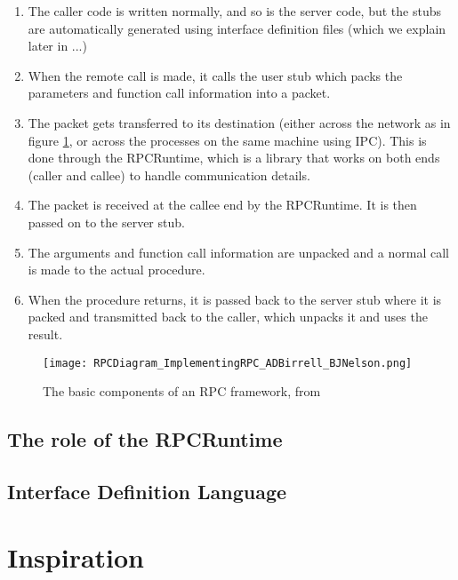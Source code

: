 \begin{enumerate}
  \item The caller code is written normally, and so is the server code, but the stubs are automatically generated using interface definition files (which we explain later in ...)
  \item When the remote call is made, it calls the user stub which packs the parameters and function call information into a packet.
  \item The packet gets transferred to its destination (either across the network as in figure \ref{fig:rpc-components}, or across the processes on the same machine using IPC). This is done through the RPCRuntime, which is a library that works on both ends (caller and callee) to handle communication details.
  \item The packet is received at the callee end by the RPCRuntime. It is then passed on to the server stub.
  \item The arguments and function call information are unpacked and a normal call is made to the actual procedure.
  \item When the procedure returns, it is passed back to the server stub where it is packed and transmitted back to the caller, which unpacks it and uses the result.
\end{enumerate}

\begin{figure}[!htb]
    \centering
    \texttt{[image: RPCDiagram\_ImplementingRPC\_ADBirrell\_BJNelson.png]}
    \caption{The basic components of an RPC framework, from \cite{birrell1984implementing}}
    \label{fig:rpc-components}
\end{figure}

\subsection{The role of the RPCRuntime}


\subsection{Interface Definition Language}

\section{Inspiration}

